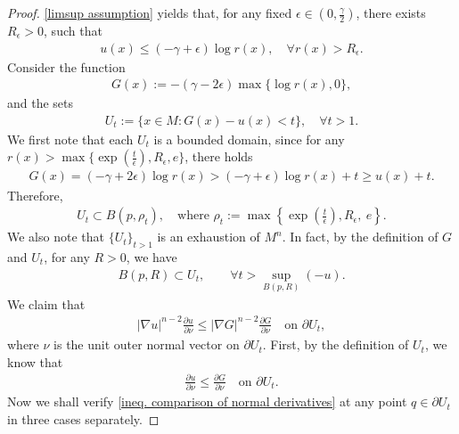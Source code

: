 \documentclass[10pt,a4paper]{amsart}
\begin{document}
\begin{proof}
    \cref{limsup assumption} yields that,
    for any fixed $\epsilon\in (0,\frac{\gamma}{2})$,  there exists $R_\epsilon>0$, such that
    \begin{align*}
        u(x)\leq (-\gamma+\epsilon)\log r(x),\quad 
        \forall r(x)>R_\epsilon.
    \end{align*}
    Consider the function
    \begin{align*}
        G(x):=-(\gamma-2\epsilon)
        \max\{\log r(x),0\},
    \end{align*}
    and the sets
    \begin{align*}
        U_t:=\{x\in M: G(x)-u(x)<t\},\quad \forall t>1.
    \end{align*}
    We first note that  each $U_t$ is a bounded domain, since for any $ r(x)>\max\{{\exp(\frac{t}{\epsilon})}, R_\epsilon, e\}$, there holds
    \begin{align*}
        G(x)
        =(-\gamma+2\epsilon)\log r(x)
        > (-\gamma+\epsilon)\log r(x)+t
        \geq u(x)+t.
    \end{align*}
    Therefore,
    \begin{align}\label{Ut is bounded}
        U_t\subset B(p,\rho_t),\quad 
        \text{where }\rho_t:=
        \max\left\{
        {\exp\left({\frac{t}{\epsilon}}\right)},R_\epsilon,\ e
        \right\}.
    \end{align}
    We also note that $\{U_t\}_{t>1}$ is an exhaustion of $M^n$. In fact, by the definition of $G$ and $U_t$, for any $R>0$, we have
    \begin{align*}
        B(p,R)\subset U_t,\qquad \forall 
        t>\sup_{B(p,R)}(-u).
    \end{align*}
    We claim that
    \begin{align}\label{ineq. comparison of normal derivatives}
        |\nabla u|^{n-2}\frac{\partial u}{\partial\nu}
        \leq |\nabla G|^{n-2}\frac{\partial G}{\partial\nu}\quad 
        \text{on }\partial U_t,
    \end{align}
    where $\nu$ is the unit outer normal vector on $\partial U_t$. First, by the definition of $U_t$, we know that
    \begin{align*}
        \frac{\partial u}{\partial \nu}
        \leq \frac{\partial G}{\partial\nu}
        \quad \text{on }\partial U_t.
    \end{align*}
    Now we shall verify \cref{ineq. comparison of normal derivatives} at any point $q\in\partial U_t$ in three cases separately.
    

\end{proof}
\end{document}
